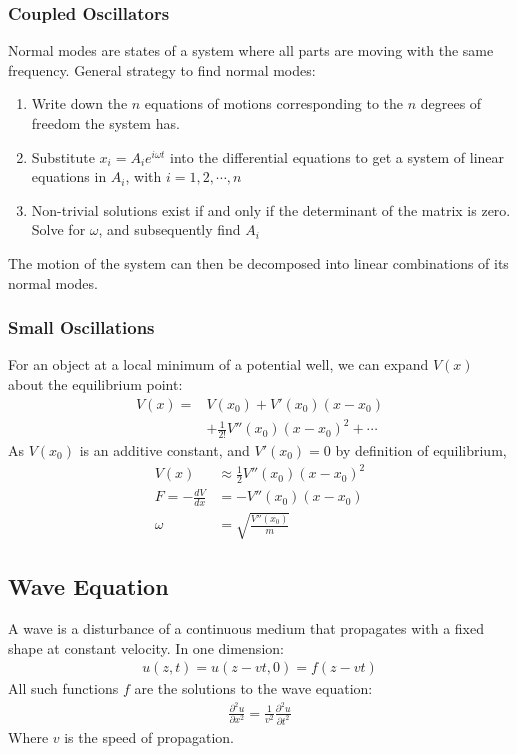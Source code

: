 \documentclass[a4paper]{article}
\newcommand{\pd}[2]{
  \ensuremath{
    \frac{\partial #1}{\partial #2} }} %
\begin{document}
\begin{multicols*}{2}
\subsubsection{Coupled Oscillators}
Normal modes are states of a system where all parts are moving with the same
frequency. General strategy to find normal modes:
\begin{enumerate}
\item Write down the $n$ equations of motions corresponding to the $n$ degrees
  of freedom the system has.
\item Substitute $x_i=A_ie^{i\omega t}$ into the differential equations to get a
  system of linear equations in $A_i$, with $i=1,2,\cdots,n$
\item Non-trivial solutions exist if and only if the determinant of the matrix
  is zero. Solve for $\omega$, and subsequently find $A_i$
\end{enumerate}
The motion of the system can then be decomposed into linear combinations of its
normal modes.
\subsubsection{Small Oscillations}
For an object at a local minimum of a potential well, we can expand $V(x)$ about
the equilibrium point:
\begin{align*}
  V(x)=&V(x_0)+V'(x_0)(x-x_0)\\
  &+ \frac{1}{2!}V''(x_0)(x-x_0)^2+\cdots
\end{align*}
As $V(x_0)$ is an additive constant, and $V'(x_0)=0$ by definition of
equilibrium,
\begin{align*}
  V(x) &\approx \frac{1}{2}V''(x_0)(x-x_0)^2 \\
  F = -\frac{dV}{dx}&=-V''(x_0)(x-x_0) \\
  \omega&=\sqrt{\frac{V''(x_0)}{m}}
\end{align*}
\subsection{Wave Equation}
A wave is a disturbance of a continuous medium that propagates with a fixed
shape at constant velocity. In one dimension:
\begin{align*}
  u(z,t)=u(z-vt,0)=f(z-vt)
\end{align*}
All such functions $f$ are the solutions to the wave equation:
\begin{align*}
  \pd{^2 u}{x^2}=\frac{1}{v^2}\pd{^2 u}{t^2}
\end{align*}
Where $v$ is the speed of propagation.


\end{multicols*}
\end{document}
